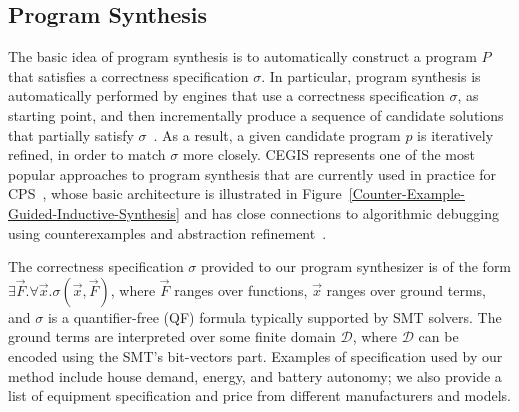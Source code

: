 \documentclass[review]{elsarticle}
\begin{document}
\subsection{Program Synthesis}
\label{sec:ProgramSynthesis}
%
The basic idea of program synthesis is to automatically construct a program $P$ that satisfies a correctness specification $\sigma$. In particular, program synthesis is automatically performed by engines that use a correctness specification $\sigma$, as starting point, and then incrementally produce a sequence of candidate solutions that partially satisfy $\sigma$~\cite{Abateetal2017}. As a result, a given candidate program $p$ is iteratively refined, in order to match $\sigma$ more closely. CEGIS represents one of the most popular approaches to program synthesis that are currently used in practice for CPS~\cite{Abateetal2017}, whose basic architecture is illustrated in Figure~\ref{Counter-Example-Guided-Inductive-Synthesis} and has close connections to algorithmic debugging using counterexamples and abstraction refinement~\cite{Alur}. 

The correctness specification $\sigma$ provided to our program synthesizer is of the form $\exists \vec{F} .  \forall \vec{x}.  \sigma(\vec{x}, \vec{F})$, where $\vec{F}$ ranges over functions, $\vec{x}$ ranges over ground terms, and $\sigma$ is a quantifier-free (QF) formula typically supported by SMT solvers. The ground terms are interpreted over some finite domain $\mathcal{D}$, where $\mathcal{D}$ can be encoded using the SMT's bit-vectors part. Examples of specification used by our method include house demand, energy, and battery autonomy; we also provide a list of equipment specification and price from different manufacturers and models.
\end{document}
